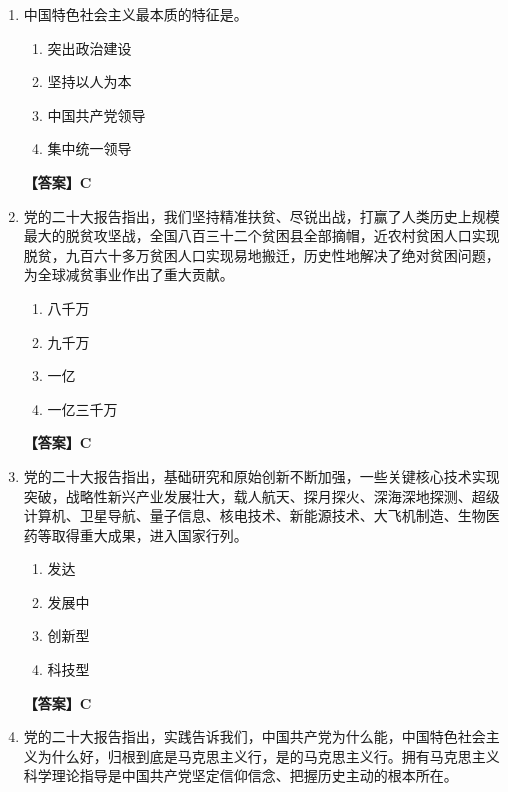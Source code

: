 \documentclass[UTF8,11pt,a4paper]{ctexart}
\begin{document}
\begin{enumerate}[label=\textbf{\arabic*.}, leftmargin=2.5em, itemsep=0.7em]
\begin{enumerate}[label=\Alph*., leftmargin=2em, itemsep=0.1em, topsep=0.15em]
\item 全面管治权
\end{enumerate}
\textbf{【答案】D}
\item 中国特色社会主义最本质的特征是\allowbreak\underline{\hspace{4em}}。
\begin{enumerate}[label=\Alph*., leftmargin=2em, itemsep=0.1em, topsep=0.15em]
\item 突出政治建设
\item 坚持以人为本
\item 中国共产党领导
\item 集中统一领导
\end{enumerate}
\textbf{【答案】C}
\item 党的二十大报告指出，我们坚持精准扶贫、尽锐出战，打赢了人类历史上规模最大的脱贫攻坚战，全国八百三十二个贫困县全部摘帽，近\allowbreak\underline{\hspace{4em}}农村贫困人口实现脱贫，九百六十多万贫困人口实现易地搬迁，历史性地解决了绝对贫困问题，为全球减贫事业作出了重大贡献。
\begin{enumerate}[label=\Alph*., leftmargin=2em, itemsep=0.1em, topsep=0.15em]
\item 八千万
\item 九千万
\item 一亿
\item 一亿三千万
\end{enumerate}
\textbf{【答案】C}
\item 党的二十大报告指出，基础研究和原始创新不断加强，一些关键核心技术实现突破，战略性新兴产业发展壮大，载人航天、探月探火、深海深地探测、超级计算机、卫星导航、量子信息、核电技术、新能源技术、大飞机制造、生物医药等取得重大成果，进入\allowbreak\underline{\hspace{4em}}国家行列。
\begin{enumerate}[label=\Alph*., leftmargin=2em, itemsep=0.1em, topsep=0.15em]
\item 发达
\item 发展中
\item 创新型
\item 科技型
\end{enumerate}
\textbf{【答案】C}
\item 党的二十大报告指出，实践告诉我们，中国共产党为什么能，中国特色社会主义为什么好，归根到底是马克思主义行，是\allowbreak\underline{\hspace{4em}}的马克思主义行。拥有马克思主义科学理论指导是中国共产党坚定信仰信念、把握历史主动的根本所在。
\begin{enumerate}[label=\Alph*., leftmargin=2em, itemsep=0.1em, topsep=0.15em]

\end{enumerate}
\end{enumerate}
\end{document}
